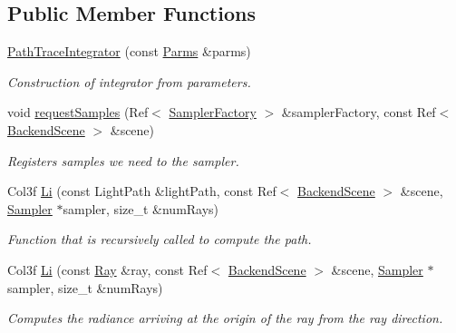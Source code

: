 \subsection*{Public Member Functions}
\begin{DoxyCompactItemize}
\item 
\hyperlink{classembree_1_1_path_trace_integrator_a9615d8a919f47e319b0178b72eb72f39}{PathTraceIntegrator} (const \hyperlink{classembree_1_1_parms}{Parms} \&parms)
\begin{DoxyCompactList}\small\item\em Construction of integrator from parameters. \item\end{DoxyCompactList}\item 
void \hyperlink{classembree_1_1_path_trace_integrator_a1c111e1fabea384da5878f7cd3962c79}{requestSamples} (Ref$<$ \hyperlink{classembree_1_1_sampler_factory}{SamplerFactory} $>$ \&samplerFactory, const Ref$<$ \hyperlink{classembree_1_1_backend_scene}{BackendScene} $>$ \&scene)
\begin{DoxyCompactList}\small\item\em Registers samples we need to the sampler. \item\end{DoxyCompactList}\item 
Col3f \hyperlink{classembree_1_1_path_trace_integrator_ad801f594f07f1cc3d90080ff2f9f80c1}{Li} (const LightPath \&lightPath, const Ref$<$ \hyperlink{classembree_1_1_backend_scene}{BackendScene} $>$ \&scene, \hyperlink{classembree_1_1_sampler}{Sampler} $\ast$sampler, size\_\-t \&numRays)
\begin{DoxyCompactList}\small\item\em Function that is recursively called to compute the path. \item\end{DoxyCompactList}\item 
Col3f \hyperlink{classembree_1_1_path_trace_integrator_a544309a59d94c3e6d24e5fa65923b0e4}{Li} (const \hyperlink{structembree_1_1_ray}{Ray} \&ray, const Ref$<$ \hyperlink{classembree_1_1_backend_scene}{BackendScene} $>$ \&scene, \hyperlink{classembree_1_1_sampler}{Sampler} $\ast$sampler, size\_\-t \&numRays)
\begin{DoxyCompactList}\small\item\em Computes the radiance arriving at the origin of the ray from the ray direction. \item\end{DoxyCompactList}\end{DoxyCompactItemize}


